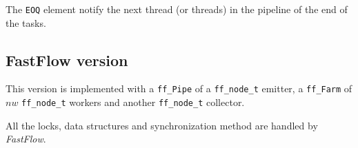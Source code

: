 The \texttt{EOQ} element notify the next thread (or threads) in the pipeline of the end of the tasks.



\subsection{FastFlow version}
This version is implemented with a \texttt{ff\_Pipe} of a \texttt{ff\_node\_t} emitter, a \texttt{ff\_Farm} of $nw$ \texttt{ff\_node\_t} workers and another \texttt{ff\_node\_t} collector.

All the locks, data structures and synchronization method are handled by \textit{FastFlow}.